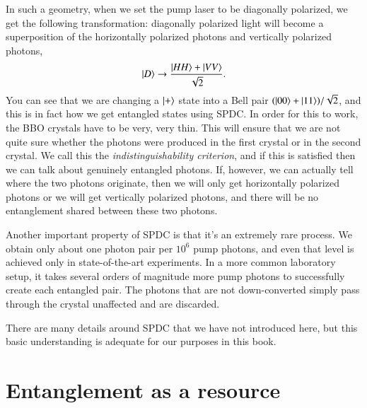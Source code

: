 In such a geometry, when we set the pump laser to be diagonally polarized, we get the following transformation: diagonally polarized light will become a superposition of the horizontally polarized photons and vertically polarized photons,
\begin{equation}
    \left| D \right\rangle \rightarrow \frac{\left| HH \right\rangle+\left| VV \right\rangle}{\sqrt{2}}.
\end{equation}
You can see that we are changing a $\left| + \right\rangle$ state into a Bell pair $(\left| 00 \right\rangle+\left| 11 \right\rangle)/\sqrt{2}$, and this is in fact how we get entangled states using SPDC.  In order for this to work, the BBO crystals have to be very, very thin. This will ensure that we are not quite sure whether the photons were produced in the first crystal or in the second crystal. We call this the \emph{indistinguishability criterion}, and if this is satisfied then we can talk about genuinely entangled photons. If, however, we can actually tell where the two photons originate, then we will only get horizontally polarized photons or we will get vertically polarized photons, and there will be no entanglement shared between these two photons. 

Another important property of SPDC is that it's an extremely rare process.  We obtain only about one photon pair per $10^6$ pump photons, and even that level is achieved only in state-of-the-art experiments. In a more common laboratory setup, it takes several orders of magnitude more pump photons to successfully create each entangled pair.  The photons that are not down-converted simply pass through the crystal unaffected and are discarded.

There are many details around SPDC that we have not introduced here, but this basic understanding is adequate for our purposes in this book.



\section{Entanglement as a resource}

